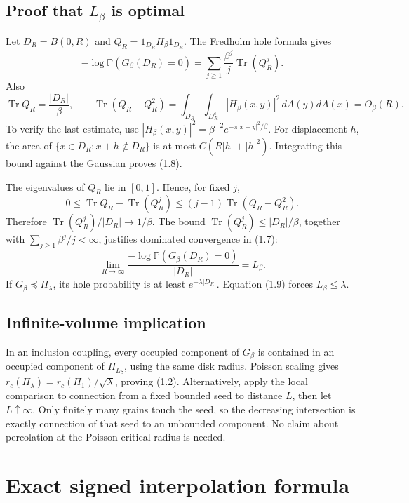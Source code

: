 \documentclass[11pt,a4paper]{article}
\theoremstyle{definition}
\theoremstyle{remark}
\numberwithin{equation}{section}
\begin{document}
\hypertarget{proof-that-l_beta-is-optimal}{%
\subsection{\texorpdfstring{Proof that \(L_\beta\) is optimal}{Proof that L\_\textbackslash beta is optimal}}\label{proof-that-l_beta-is-optimal}}

Let \(D_R=B(0,R)\) and \(Q_R=1_{D_R}H_\beta1_{D_R}\). The Fredholm hole formula gives \[
-\log\mathbb P(G_\beta(D_R)=0)
 =\sum_{j\ge1}\frac{\beta^j}{j}\operatorname{Tr}(Q_R^j).
\tag{1.7}
\] Also \[
\operatorname{Tr}Q_R=\frac{|D_R|}{\beta},\qquad
\operatorname{Tr}(Q_R-Q_R^2)
 =\int_{D_R}\int_{D_R^c}|H_\beta(x,y)|^2\,dA(y)dA(x)
 =O_\beta(R).
\tag{1.8}
\] To verify the last estimate, use \(|H_\beta(x,y)|^2=\beta^{-2}e^{-\pi|x-y|^2/\beta}\). For displacement \(h\), the area of \(\{x\in D_R:x+h\notin D_R\}\) is at most \(C(R|h|+|h|^2)\). Integrating this bound against the Gaussian proves (1.8).

The eigenvalues of \(Q_R\) lie in \([0,1]\). Hence, for fixed \(j\), \[
0\le\operatorname{Tr}Q_R-\operatorname{Tr}(Q_R^j)
\le(j-1)\operatorname{Tr}(Q_R-Q_R^2).
\] Therefore \(\operatorname{Tr}(Q_R^j)/|D_R|\to1/\beta\). The bound \(\operatorname{Tr}(Q_R^j)\le|D_R|/\beta\), together with \(\sum_{j\ge1}\beta^j/j<\infty\), justifies dominated convergence in (1.7): \[
\lim_{R\to\infty}
\frac{-\log\mathbb P(G_\beta(D_R)=0)}{|D_R|}
=L_\beta.
\tag{1.9}
\] If \(G_\beta\preceq\Pi_\lambda\), its hole probability is at least \(e^{-\lambda|D_R|}\). Equation (1.9) forces \(L_\beta\le\lambda\).

\hypertarget{infinite-volume-implication}{%
\subsection{Infinite-volume implication}\label{infinite-volume-implication}}

In an inclusion coupling, every occupied component of \(G_\beta\) is contained in an occupied component of \(\Pi_{L_\beta}\), using the same disk radius. Poisson scaling gives \(r_c(\Pi_\lambda)=r_c(\Pi_1)/\sqrt\lambda\), proving (1.2). Alternatively, apply the local comparison to connection from a fixed bounded seed to distance \(L\), then let \(L\uparrow\infty\). Only finitely many grains touch the seed, so the decreasing intersection is exactly connection of that seed to an unbounded component. No claim about percolation at the Poisson critical radius is needed.

\hypertarget{exact-signed-interpolation-formula}{%
\section{Exact signed interpolation formula}\label{exact-signed-interpolation-formula}}
\end{document}

